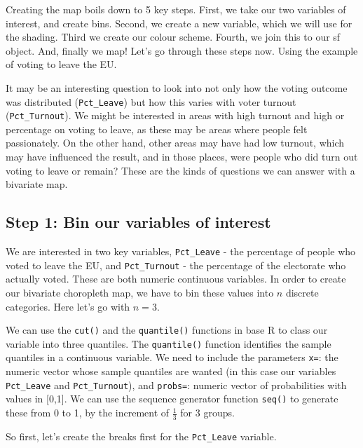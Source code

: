 \documentclass[
  krantz2]{krantz}
\begin{document}
Creating the map boils down to 5 key steps. First, we take our two variables of interest, and create bins. Second, we create a new variable, which we will use for the shading. Third we create our colour scheme. Fourth, we join this to our sf object. And, finally we map! Let's go through these steps now. Using the example of voting to leave the EU.

It may be an interesting question to look into not only how the voting outcome was distributed (\texttt{Pct\_Leave}) but how this varies with voter turnout (\texttt{Pct\_Turnout}). We might be interested in areas with high turnout and high or percentage on voting to leave, as these may be areas where people felt passionately. On the other hand, other areas may have had low turnout, which may have influenced the result, and in those places, were people who did turn out voting to leave or remain? These are the kinds of questions we can answer with a bivariate map.

\hypertarget{step-1-bin-our-variables-of-interest}{%
\subsection{Step 1: Bin our variables of interest}\label{step-1-bin-our-variables-of-interest}}

We are interested in two key variables, \texttt{Pct\_Leave} - the percentage of people who voted to leave the EU, and \texttt{Pct\_Turnout} - the percentage of the electorate who actually voted. These are both numeric continuous variables. In order to create our bivariate choropleth map, we have to bin these values into \(n\) discrete categories. Here let's go with \(n = 3\).

We can use the \texttt{cut()} and the \texttt{quantile()} functions in base R to class our variable into three quantiles. The \texttt{quantile()} function identifies the sample quantiles in a continuous variable. We need to include the parameters \texttt{x=}: the numeric vector whose sample quantiles are wanted (in this case our variables \texttt{Pct\_Leave} and \texttt{Pct\_Turnout}), and \texttt{probs=}: numeric vector of probabilities with values in {[}0,1{]}. We can use the sequence generator function \texttt{seq()} to generate these from 0 to 1, by the increment of \(\frac{1}{3}\) for 3 groups.

So first, let's create the breaks first for the \texttt{Pct\_Leave} variable.
\end{document}
